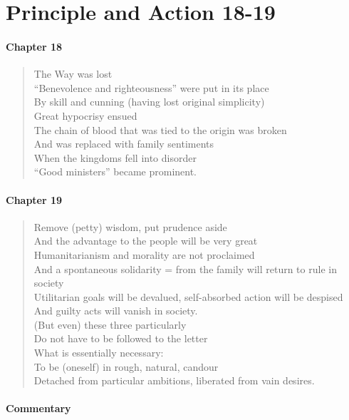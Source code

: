 \section{Principle and Action 18-19}

\paragraph{Chapter 18}

\begin{verse}
The Way was lost\\ ``Benevolence and righteousness'' were put in its place\\ By skill and cunning (having lost original simplicity)\\ Great hypocrisy ensued\\ The chain of blood that was tied to the origin was broken\\ And was replaced with family sentiments\\ When the kingdoms fell into disorder\\ ``Good ministers'' became prominent.
\end{verse}

\paragraph{Chapter 19}

\begin{verse}
Remove (petty) wisdom, put prudence aside\\ And the advantage to the people will be very great\\ Humanitarianism and morality are not proclaimed\\ And a spontaneous solidarity = from the family will return to rule in society\\ Utilitarian goals will be devalued, self-absorbed action will be despised\\ And guilty acts will vanish in society.\\ (But even) these three particularly\\ Do not have to be followed to the letter\\ What is essentially necessary:\\ To be (oneself) in rough, natural, candour\\ Detached from particular ambitions, liberated from vain desires.
\end{verse}

\paragraph{Commentary}


